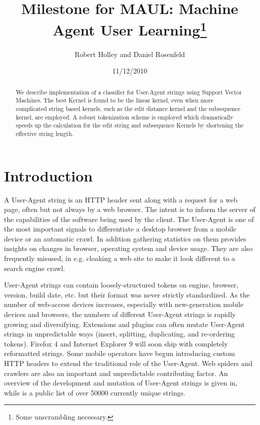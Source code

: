 \documentclass[10pt]{article}
\title{Milestone for MAUL: Machine Agent User Learning\footnote{Some unscrambling necessary.} }
\author{Robert Holley and Daniel Rosenfeld}
\date{11/12/2010}
\begin{document}
\maketitle
\begin{abstract}
We describe implementation of a classifier for User-Agent strings using Support Vector Machines.  The best Kernel is found to be the linear kernel, even when more complicated string based kernels, such as the edit distance kernel and the subsequence kernel, are employed.  A robust tokenization scheme is employed which dramatically speeds up the calculation for the edit string and subsequence Kernels by shortening the effective string length. 
\end{abstract}


\section{Introduction}
A User-Agent string is an HTTP header sent along with a request for a web page, often but not always by a web browser.\cite{httprfc} The intent is to inform the server
of the capabilities of the software being used by the client. The User-Agent is
one of the most important signals to differentiate a desktop browser from a
mobile device or an automatic crawl. In addition gathering statistics on them
provides insights on changes in browser, operating system and device usage. They
are also frequently misused, in e.g. cloaking a web site to make it look
different to a search engine crawl.

User-Agent strings can contain loosely-structured tokens on engine, browser,
version, build date, etc. but their format was never strictly standardized.\cite{httprfc}
As the number of web-access devices increases, especially with new-generation
mobile devices and browsers, the numbers of different User-Agent strings is
rapidly growing and diversifying. Extensions and plugins can often mutate
User-Agent strings in unpredictable ways (insert, splitting, duplicating, and
re-ordering tokens). Firefox 4 and Internet Explorer 9 will soon ship with
completely reformatted strings. Some mobile operators have begun introducing
custom HTTP headers to extend the traditional role of the User-Agent.\cite{mobile} Web spiders and crawlers are also an important and unpredictable contributing factor.
An overview of the development and mutation of User-Agent strings is given in,\cite{history} while \cite{uatracker} is a public list of over 50000 currently unique strings.
\end{document}
